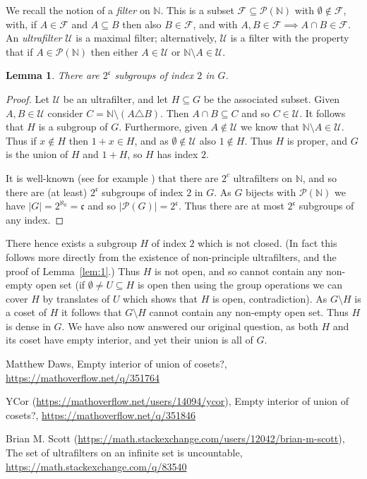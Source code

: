 \documentclass[twoside,a4paper,12pt]{article}
\theoremstyle{plain}
\newtheorem{lemma}[proposition]{Lemma}
\theoremstyle{definition}
\newcommand{\mc}{\mathcal}
\newcommand{\mf}{\mathfrak}
\begin{document}
We recall the notion of a \emph{filter} on $\mathbb N$.  This is a subset $\mc F\subseteq
\mc P(\mathbb N)$ with $\emptyset\not\in\mc F$, with, if $A\in\mc F$ and $A\subseteq B$ then also
$B\in\mc F$, and with $A,B\in\mc F\implies A\cap B\in\mc F$.  An \emph{ultrafilter} $\mc U$
is a maximal filter; alternatively, $\mc U$ is a filter with the property that if
$A\in\mc P(\mathbb N)$ then either $A\in\mc U$ or $\mathbb N\setminus A\in\mc U$.

\begin{lemma}
There are $2^{\mf{c}}$ subgroups of index $2$ in $G$.
\end{lemma}
\begin{proof}
Let $\mc U$ be an ultrafilter, and let $H\subseteq G$ be the associated subset.  Given $A,B\in\mc U$
consider $C=\mathbb N \setminus (A\triangle B)$.  Then $A\cap B \subseteq C$ and so $C\in\mc U$.
It follows that $H$ is a subgroup of $G$.  Furthermore, given $A\not\in\mc U$ we know that
$\mathbb N\setminus A\in\mc U$.  Thus if $x\not\in H$ then $1+x\in H$, and as $\emptyset\not\in
\mc U$ also $1\not\in H$.  Thus $H$ is proper, and $G$ is the union of $H$ and $1+H$, so $H$ has
index $2$.

It is well-known (see for example \cite{a2}) that there are $2^c$ ultrafilters on $\mathbb N$,
and so there are (at least) $2^\mf{c}$ subgroups of index $2$ in $G$.  As $G$ bijects with
$\mc P(\mathbb N)$ we have $|G| = 2^{\aleph_0} = \mf{c}$ and so $|\mc P(G)| = 2^{\mf{c}}$.
Thus there are at most $2^{\mf{c}}$ subgroups of any index.
\end{proof}

There hence exists a subgroup $H$ of index $2$ which is not closed.  (In fact this follows more
directly from the existence of non-principle ultrafilters, and the proof of Lemma~\ref{lem:1}.)
Thus $H$ is not open, and so cannot contain any non-empty open set (if $\emptyset\not=
U\subseteq H$ is open then using the group operations we can cover $H$ by translates of $U$ which
shows that $H$ is open, contradiction).  As $G\setminus H$ is a coset of $H$ it follows that
$G\setminus H$ cannot contain any non-empty open set.  Thus $H$ is dense in $G$.  We have also
now answered our original question, as both $H$ and its coset have empty interior, and yet their
union is all of $G$.

\begin{thebibliography}{aa}

 Matthew Daws, Empty interior of union of cosets?, 
   \url{https://mathoverflow.net/q/351764}

 YCor (\url{https://mathoverflow.net/users/14094/ycor}), Empty interior of union of cosets?,
   \url{https://mathoverflow.net/q/351846}

 Brian M. Scott (\url{https://math.stackexchange.com/users/12042/brian-m-scott}), The set of ultrafilters on an infinite set is uncountable, \url{https://math.stackexchange.com/q/83540}

\end{thebibliography}
\end{document}
